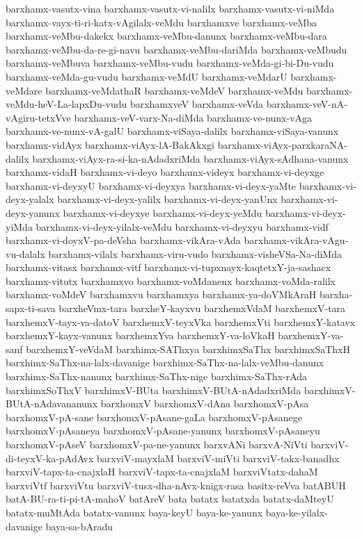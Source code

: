 {barxhamx-vasutx-vina
barxhamx-vasutx-vi-nalilx
barxhamx-vasutx-vi-niMda
barxhamx-vayx-ti-ri-katx-vAgilalx-veMdu
barxhamxve
barxhamx-veMba
barxhamx-veMbu-dakekx
barxhamx-veMbu-danunx
barxhamx-veMbu-dara
barxhamx-veMbu-da-re-gi-navu
barxhamx-veMbu-dariMda
barxhamx-veMbudu
barxhamx-veMbuva
barxhamx-veMbu-vudu
barxhamx-veMda-gi-bi-Du-vudu
barxhamx-veMda-gu-vudu
barxhamx-veMdU
barxhamx-veMdarU
barxhamx-veMdare
barxhamx-veMdathaR
barxhamx-veMdeV
barxhamx-veMdu
barxhamx-veMdu-heV-La-lapxDu-vudu
barxhamxveV
barxhamx-veVda
barxhamx-veV-nA-vAgiru-tetxVve
barxhamx-veV-varx-Na-diMda
barxhamx-ve-nunx-vAga
barxhamx-ve-nunx-vA-galU
barxhamx-viSaya-dalilx
barxhamx-viSaya-vanunx
barxhamx-vidAyx
barxhamx-viAyx-lA-BakAkxgi
barxhamx-viAyx-parxkaraNA-dalilx
barxhamx-viAyx-ra-si-ka-nAdadxriMda
barxhamx-viAyx-sAdhana-vanunx
barxhamx-vidaH
barxhamx-vi-deyo
barxhamx-videyx
barxhamx-vi-deyxge
barxhamx-vi-deyxyU
barxhamx-vi-deyxya
barxhamx-vi-deyx-yaMte
barxhamx-vi-deyx-yalalx
barxhamx-vi-deyx-yalilx
barxhamx-vi-deyx-yanUnx
barxhamx-vi-deyx-yanunx
barxhamx-vi-deyxye
barxhamx-vi-deyx-yeMdu
barxhamx-vi-deyx-yiMda
barxhamx-vi-deyx-yilalx-veMdu
barxhamx-vi-deyxyu
barxhamx-vidf
barxhamx-vi-doyxV-pa-deVsha
barxhamx-vikAra-vAda
barxhamx-vikAra-vAgu-vu-dalalx
barxhamx-vilalx
barxhamx-viru-vudo
barxhamx-visheVSa-Na-diMda
barxhamx-vitasx
barxhamx-vitf
barxhamx-vi-tupxnayx-kaqtetxY-ja-sashacx
barxhamx-vitutx
barxhamxvo
barxhamx-voMdanenx
barxhamx-voMda-ralilx
barxhamx-voMdeV
barxhamxvu
barxhamxya
barxhamx-ya-doVMkAraH
barxha-sapx-ti-sava
barxheVmx-tara
barxheY-kayxvu
barxhemxVdaM
barxhemxV-tara
barxhemxV-tayx-va-datoV
barxhemxV-teyxVka
barxhemxVti
barxhemxY-katavx
barxhemxY-kayx-vanunx
barxhemxYva
barxhemxY-va-loVkaH
barxhemxY-va-sanf
barxhemxY-veVdaM
barxhimx-SAThxya
barxhimxSaThx
barxhimxSaThxH
barxhimx-SaThx-na-lalx-davanige
barxhimx-SaThx-na-lalx-veMbu-danunx
barxhimx-SaThx-nanunx
barxhimx-SaThx-nige
barxhimx-SaThx-rAda
barxhimxSoThxV
barxhimxV-BUta
barxhimxV-BUtA-nAdadxriMda
barxhimxV-BUtA-nAdavananunx
barxhomxV
barxhomxV-dAna
barxhomxV-pAsa
barxhomxV-pA-sane
barxhomxV-pAsane-gaLa
barxhomxV-pAsanege
barxhomxV-pAsaneya
barxhomxV-pAsane-yanunx
barxhomxV-pAsaneyu
barxhomxV-pAseV
barxhomxV-pa-ne-yanunx
barxvANi
barxvA-NiVti
barxviV-di-teyxV-ka-pAdAvx
barxviV-mayxlaM
barxviV-miVti
barxviV-takx-banadhx
barxviV-tapx-ta-cnajxlaH
barxviV-tapx-ta-cnajxlaM
barxviVtatx-dahaM
barxviVtf
barxviVtu
barxviV-tusx-dha-nAvx-knigx-rasa
basitx-reVva
batABUH
batA-BU-ra-ti-pi-tA-mahoV
batAreV
bata
batatx
batatxda
batatx-daMteyU
batatx-muMtAda
batatx-vanunx
baya-keyU
baya-ke-yanunx
baya-ke-yilalx-davanige
baya-sa-bAradu
}
